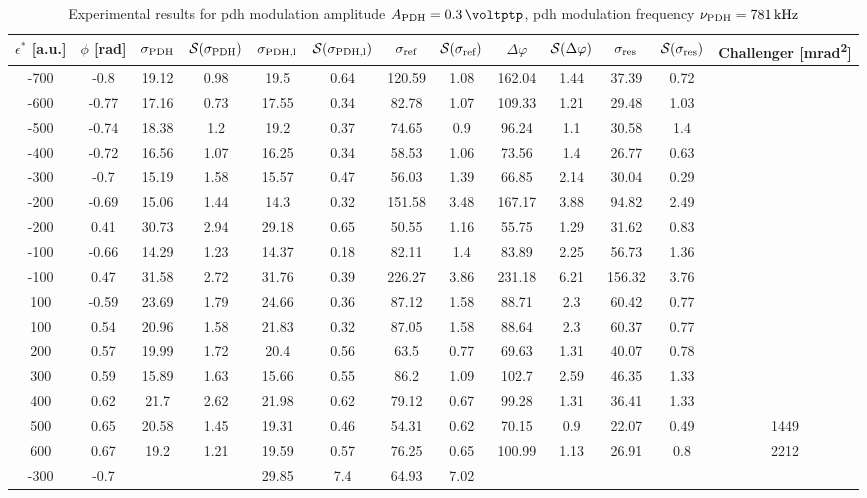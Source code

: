 \begin{landscape}
	\begin{table}
	\centering
	\begin{tabular}{|c|c|c|c|c|c|c|c|c|c|c|c|c|}
		\hline
		$\epsilon^*$ [a.u.] & $\phi$ [\si{\radian}] & $\sigma_{\text{PDH}}$ & $\mathcal{S}(\sigma_{\text{PDH}})$ & $\sigma_{\text{PDH,l}}$ & $\mathcal{S}(\sigma_{\text{PDH,l}})$  & $\sigma_{\text{ref}}$ & $\mathcal{S}(\sigma_{\text{ref}})$ & $\Delta \varphi$ & $\mathcal{S}(\Delta \varphi)$ & $\sigma_{\text{res}}$  & $\mathcal{S}(\sigma_{\text{res}})$ & Challenger [\si{\milli\radian\squared}] \\
		\hline
		\hline
		-700 & -0.8 & 19.12 & 0.98 & 19.5 & 0.64 & 120.59 & 1.08 & 162.04 & 1.44 & 37.39 & 0.72 & \\
		-600 & -0.77 & 17.16 & 0.73 & 17.55 & 0.34 & 82.78 & 1.07 & 109.33 & 1.21 & 29.48 & 1.03 & \\
		-500 & -0.74 & 18.38 & 1.2 & 19.2 & 0.37 & 74.65 & 0.9 & 96.24 & 1.1 & 30.58 & 1.4 & \\
		-400 & -0.72 & 16.56 & 1.07 & 16.25 & 0.34 & 58.53 & 1.06 & 73.56 & 1.4 & 26.77 & 0.63 & \\
		-300 & -0.7 & 15.19 & 1.58 & 15.57 & 0.47 & 56.03 & 1.39 & 66.85 & 2.14 & 30.04 & 0.29 & \\
		-200 & -0.69 & 15.06 & 1.44 & 14.3 & 0.32 & 151.58 & 3.48 & 167.17 & 3.88 & 94.82 & 2.49 & \\
		-200 & 0.41 & 30.73 & 2.94 & 29.18 & 0.65 & 50.55 & 1.16 & 55.75 & 1.29 & 31.62 & 0.83 & \\
		-100 & -0.66 & 14.29 & 1.23 & 14.37 & 0.18 & 82.11 & 1.4 & 83.89 & 2.25 & 56.73 & 1.36 & \\
		-100 & 0.47 & 31.58 & 2.72 & 31.76 & 0.39 & 226.27 & 3.86 & 231.18 & 6.21 & 156.32 & 3.76 & \\
		100 & -0.59 & 23.69 & 1.79 & 24.66 & 0.36 & 87.12 & 1.58 & 88.71 & 2.3 & 60.42 & 0.77 & \\
		100 & 0.54 & 20.96 & 1.58 & 21.83 & 0.32 & 87.05 & 1.58 & 88.64 & 2.3 & 60.37 & 0.77 & \\
		200 & 0.57 & 19.99 & 1.72 & 20.4 & 0.56 & 63.5 & 0.77 & 69.63 & 1.31 & 40.07 & 0.78 & \\
		300 & 0.59 & 15.89 & 1.63 & 15.66 & 0.55 & 86.2 & 1.09 & 102.7 & 2.59 & 46.35 & 1.33 & \\
		400 & 0.62 & 21.7 & 2.62 & 21.98 & 0.62 & 79.12 & 0.67 & 99.28 & 1.31 & 36.41 & 1.33 & \\
		500 & 0.65 & 20.58 & 1.45 & 19.31 & 0.46 & 54.31 & 0.62 & 70.15 & 0.9 & 22.07 & 0.49 & 1449\\
		600 & 0.67 & 19.2 & 1.21 & 19.59 & 0.57 & 76.25 & 0.65 & 100.99 & 1.13 & 26.91 & 0.8 & 2212\\
		\hline
		\hline
		-300 & -0.7 & & & 29.85 & 7.4 & 64.93 & 7.02 & & & & &\\
		\hline 
	\end{tabular}
	\caption{Experimental results for \gls{pdh} modulation amplitude $\tind{A}{PDH} = \SI{0.3}{\voltptp}$, \gls{pdh} modulation frequency $\nu_{\text{PDH}} = \SI{781}{\kilo\hertz}$}
	\end{table}
	

\end{landscape}
